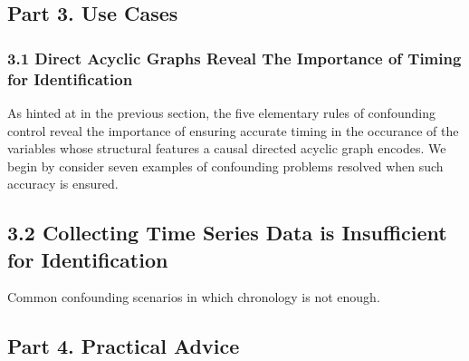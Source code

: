 \documentclass[
  single column]{article}
\begin{document}
\newpage{}

\subsection{Part 3. Use Cases}\label{part-3.-use-cases}

\subsubsection{3.1 Direct Acyclic Graphs Reveal The Importance of Timing
for
Identification}\label{direct-acyclic-graphs-reveal-the-importance-of-timing-for-identification}

\begin{table}

\caption{\label{tbl-elementary-chronological-hyg}}

\centering{

\captionsetup{labelsep=none}

\terminologychronologicalhygeine

}

\end{table}%

As hinted at in the previous section, the five elementary rules of
confounding control reveal the importance of ensuring accurate timing in
the occurance of the variables whose structural features a causal
directed acyclic graph encodes. We begin by consider seven examples of
confounding problems resolved when such accuracy is ensured.

\subsection{3.2 Collecting Time Series Data is Insufficient for
Identification}\label{collecting-time-series-data-is-insufficient-for-identification}

\begin{table}

\caption{\label{tbl-chronology-notenough}Common confounding scenarios in
which chronology is not enough.}

\centering{

\terminologychronologicalhygeineNOTENOUGH

}

\end{table}%

\subsection{Part 4. Practical Advice}\label{part-4.-practical-advice}
\end{document}
